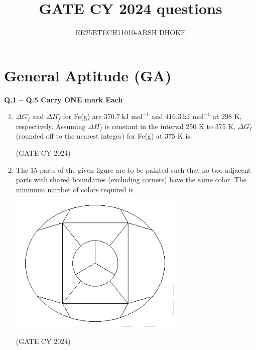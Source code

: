 \documentclass[12pt]{article}
\author{EE25BTECH11010-ARSH DHOKE}
\title{GATE CY 2024 questions}
\date{}
\begin{document}
\maketitle

\section*{General Aptitude (GA)}
\textbf{Q.1 -- Q.5 Carry ONE mark Each}

\begin{enumerate}
\item $\Delta G_f^\circ$ and $\Delta H_f^\circ$ for Fe(g) are $370.7~\text{kJ mol}^{-1}$ and $416.3~\text{kJ mol}^{-1}$ at 298 K, respectively. Assuming $\Delta H_f^\circ$ is constant in the interval 250 K to 375 K, $\Delta G_f^\circ$ (rounded off to the nearest integer) for Fe(g) at 375 K is:

\begin{enumerate}
\end{enumerate}
\hfill (GATE CY 2024)

\item The 15 parts of the given figure are to be painted such that no two adjacent parts with shared boundaries (excluding corners) have the same color. The minimum number of colors required is

\begin{center}
\includegraphics[width=0.4\columnwidth]{figs/q2.png}
\label{fig:q2}
\end{center}

\begin{enumerate}
\end{enumerate}
\hfill (GATE CY 2024)


\end{enumerate}
\end{document}
